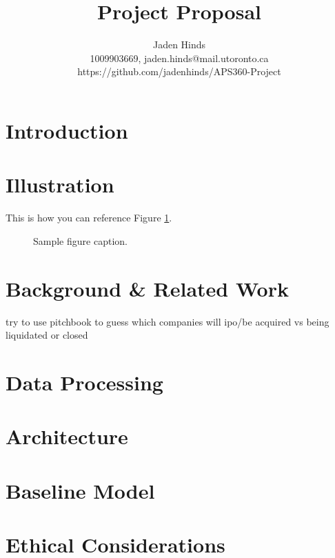 \documentclass[final]{article}
\title{Project Proposal}
\author{%
  Jaden Hinds \\
  1009903669, jaden.hinds@mail.utoronto.ca\\
  https://github.com/jadenhinds/APS360-Project\\
}
\begin{document}
\maketitle

\vspace{-0.5in}

\section*{Introduction}

\section*{Illustration}
This is how you can reference Figure \ref{fig:sample}.

\begin{figure}[!h]
  \centering
  \fbox{\rule[-.5cm]{0cm}{4cm} \rule[-.5cm]{4cm}{0cm}}
  \caption{Sample figure caption.}
  \label{fig:sample}
\end{figure}

\section*{Background \& Related Work}
try to use pitchbook to guess which companies will ipo/be acquired vs being liquidated or closed
\section*{Data Processing}

\section*{Architecture}

\section*{Baseline Model}

\section*{Ethical Considerations}

\newpage
\nocite{*}
\end{document}
